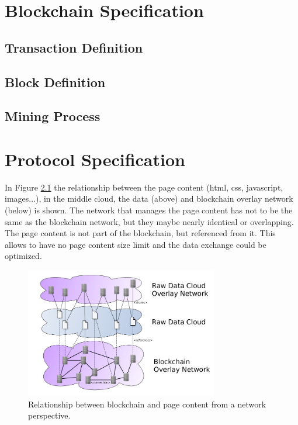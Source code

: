 \documentclass[12pt,fleqn]{book} %
\begin{document}

\chapter{Blockchain Specification}

\section{Transaction Definition}


\section{Block Definition}

\section{Mining Process}


\chapter{Protocol Specification}

In Figure \ref{fig:data_cloud_blockchain} the relationship between the page
content (html, css, javascript, images...), in the middle cloud, the data
(above) and blockchain overlay network (below) is shown. The network that
manages the page content has not to be the same as the blockchain network, but
they maybe nearly identical or overlapping. The page content is not part of
the blockchain, but referenced from it. This allows to have no page content
size limit and the data exchange could be optimized.

\begin{figure}[htp]
\centering
\includegraphics[width=0.75\textwidth]{pictures/data_cloud_blockchain.png}
\caption{Relationship between blockchain and page content from a network
perspective.}
\label{fig:data_cloud_blockchain}
\end{figure}
\end{document}
